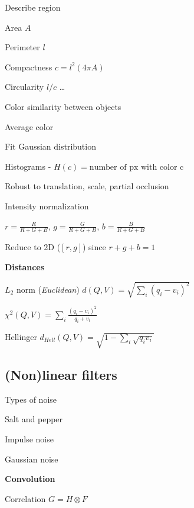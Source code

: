 \documentclass{article}
\begin{document}
\begin{multicols*}{2}
{\begin{compactitem}
		\item Describe region
		\begin{compactitem}
			\item Area $A$
			\item Perimeter $l$
			\item Compactness $c = l^2(4 \pi A)$
			\item Circularity $l/c$
			\dots
		\end{compactitem}
	\end{compactitem}

	Color similarity between objects
	\begin{compactitem}
		\item Average color
		\item Fit Gaussian distribution
		\item Histograms - $H(c) = \text{number of px with color c}$

		Robust to translation, scale, partial occlusion

		\item Intensity normalization

		$r=\frac{R}{R+G+B}$,
		$g=\frac{G}{R+G+B}$,
		$b=\frac{B}{R+G+B}$

		Reduce to 2D ($[r,g]$) since
		$r+g+b=1$
	\end{compactitem}

	\textbf{Distances}
	\begin{compactitem}
		\item $L_2$ norm (\textit{Euclidean})
		$d(Q,V) = \sqrt{\sum_i(q_i-v_i)^2}$

		\item $\chi^2(Q, V) = \sum_i{\frac{(q_i - v_i)^2}{q_i+v_i}}$

		\item Hellinger $d_{Hell}(Q, V) = \sqrt{1 - \sum_i{\sqrt{q_i v_i}}}$
	\end{compactitem}

	\subsection{(Non)linear filters}

	Types of noise
	\begin{compactitem}
		\item Salt and pepper
		\item Impulse noise
		\item Gaussian noise
	\end{compactitem}

	\textbf{Convolution}
	\begin{compactitem}
		\item Correlation $G = H \otimes F$


\end{compactitem}}
\end{multicols*}
\end{document}
